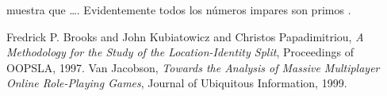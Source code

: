 \documentclass[a5paper]{article}
\begin{document}
\cite{Brooks1997Methodology} muestra 
que \ldots. Evidentemente todos 
los n\'umeros impares son primos 
\cite{Jacobson1999Towards}.

\begin{thebibliography}{1}
  Fredrick P. Brooks and 
  John Kubiatowicz and
  Christos Papadimitriou,
  \emph{A Methodology for the Study of the
    Location-Identity Split},
  Proceedings of OOPSLA,
  1997.
  Van Jacobson,
  \emph{Towards the Analysis of Massive 
    Multiplayer Online Role-Playing Games},
  Journal of Ubiquitous Information,
  1999.  
\end{thebibliography}
\end{document}
